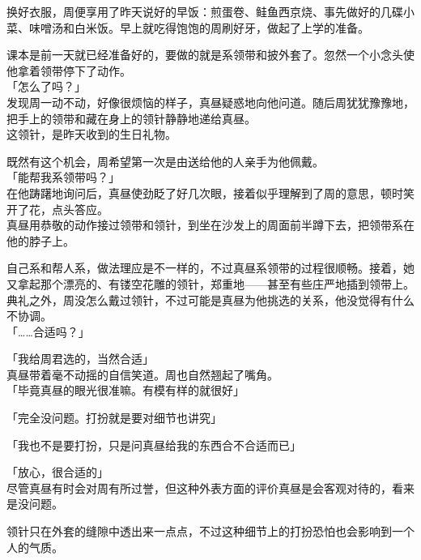 换好衣服，周便享用了昨天说好的早饭：煎蛋卷、鲑鱼西京烧、事先做好的几碟小菜、味噌汤和白米饭。早上就吃得饱饱的周刷好牙，做起了上学的准备。

课本是前一天就已经准备好的，要做的就是系领带和披外套了。忽然一个小念头使他拿着领带停下了动作。\\

「怎么了吗？」\\

发现周一动不动，好像很烦恼的样子，真昼疑惑地向他问道。随后周犹犹豫豫地，把手上的领带和藏在身上的领针静静地递给真昼。\\

这领针，是昨天收到的生日礼物。

既然有这个机会，周希望第一次是由送给他的人亲手为他佩戴。\\

「能帮我系领带吗？」\\

在他踌躇地询问后，真昼使劲眨了好几次眼，接着似乎理解到了周的意思，顿时笑开了花，点头答应。\\

真昼用恭敬的动作接过领带和领针，到坐在沙发上的周面前半蹲下去，把领带系在他的脖子上。

自己系和帮人系，做法理应是不一样的，不过真昼系领带的过程很顺畅。接着，她又拿起那个漂亮的、有镂空花雕的领针，郑重地——甚至有些庄严地插到领带上。\\

典礼之外，周没怎么戴过领针，不过可能是真昼为他挑选的关系，他没觉得有什么不协调。\\

「……合适吗？」

「我给周君选的，当然合适」\\

真昼带着毫不动摇的自信笑道。周也自然翘起了嘴角。\\

「毕竟真昼的眼光很准嘛。有模有样的就很好」

「完全没问题。打扮就是要对细节也讲究」

「我也不是要打扮，只是问真昼给我的东西合不合适而已」

「放心，很合适的」\\

尽管真昼有时会对周有所过誉，但这种外表方面的评价真昼是会客观对待的，看来是没问题。

领针只在外套的缝隙中透出来一点点，不过这种细节上的打扮恐怕也会影响到一个人的气质。\\

